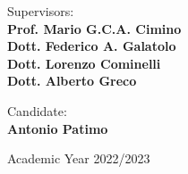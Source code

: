 \documentclass[../main.tex]{subfiles}
\begin{document}
\begin{titlepage}
    \vspace{20mm}
    \begin{minipage}[t]{0.6\textwidth}\raggedright
        \large{Supervisors:}\\
        \large{\textbf{Prof. Mario G.C.A. Cimino}}\\  
        \large{\textbf{Dott. Federico A. Galatolo}}\\
        \large{\textbf{Dott. Lorenzo Cominelli}}\\
        \large{\textbf{Dott. Alberto Greco}}\\     
    \end{minipage}
    \hfill
    \begin{minipage}[t]{0.3\textwidth}\raggedleft
        \large{Candidate:}\\
        \large{\textbf{Antonio Patimo}}
    \end{minipage}
    \vfill
    \begin{center}
        \large{Academic Year 2022/2023}
    \end{center}
        
\end{titlepage}
\end{document}
